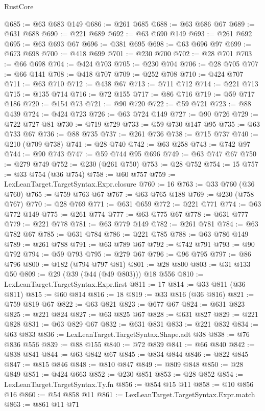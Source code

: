 \begin{lexlean}{RustCore}
\begin{coremodule}
@685 := @63 @683 @149
@686 := @261 @685
@688 := @63 @686 @67
@689 := @631 @688
@690 := @221 @689
@692 := @63 @690 @149
@693 := @261 @692
@695 := @63 @693 @67
@696 := @381 @695
@698 := @63 @696 @97
@699 := @673 @698
@700 := @418 @699
@701 := @230 @700
@702 := @28 @701
@703 := @66 @698
@704 := @424 @703
@705 := @230 @704
@706 := @28 @705
@707 := @66 @141
@708 := @418 @707
@709 := @252 @708
@710 := @424 @707
@711 := @63 @710
@712 := @438 @67
@713 := @711 @712
@714 := @221 @713
@715 := @135 @714
@716 := @72 @155
@717 := @86 @716
@719 := @59 @717 @186
@720 := @154 @73
@721 := @90 @720
@722 := @59 @721
@723 := @88 @439
@724 := @424 @723
@726 := @63 @724 @149
@727 := @90 @726
@729 := @722 @727 @81
@730 := @719 @729
@733 := @59 @730 @147 @95
@735 := @63 @733 @67
@736 := @88 @735
@737 := @261 @736
@738 := @715 @737
@740 := @210 (@709 @738)
@741 := @28 @740
@742 := @63 @258
@743 := @742 @97
@744 := @90 @743
@747 := @59 @744 @95 @696
@749 := @63 @747 @67
@750 := @279 @749
@752 := @230 (@261 @750)
@753 := @28 @752
@754 := 15
@757 := @33 @754 (@36 @754)
@758 := @60 @757
@759 := LexLeanTarget.TargetSyntax.Expr.closure
@760 := 16
@763 := @33 @760 (@36 @760)
@765 := @759 @763 @67
@767 := @63 @765 @188
@769 := @230 (@758 @767)
@770 := @28 @769
@771 := @631 @659
@772 := @221 @771
@774 := @63 @772 @149
@775 := @261 @774
@777 := @63 @775 @67
@778 := @631 @777
@779 := @221 @778
@781 := @63 @779 @149
@782 := @261 @781
@784 := @63 @782 @67
@785 := @631 @784
@786 := @221 @785
@788 := @63 @786 @149
@789 := @261 @788
@791 := @63 @789 @67
@792 := @742 @791
@793 := @90 @792
@794 := @59 @793
@795 := @279 @67
@796 := @96 @795
@797 := @86 @796
@800 := @182 (@794 @797 @81)
@801 := @28 @800
@803 := @31 @133 @50
@809 := @29 (@39 (@44 (@49 @803))) @18 @556
@810 := LexLeanTarget.TargetSyntax.Expr.first
@811 := 17
@814 := @33 @811 (@36 @811)
@815 := @60 @814
@816 := 18
@819 := @33 @816 (@36 @816)
@821 := @759 @819 @67
@822 := @63 @821
@823 := @677 @67
@824 := @631 @823
@825 := @221 @824
@827 := @63 @825 @67
@828 := @631 @827
@829 := @221 @828
@831 := @63 @829 @67
@832 := @631 @831
@833 := @221 @832
@834 := @63 @833
@836 := LexLeanTarget.TargetSyntax.Shape.adt @38
@838 := @76 @836 @556
@839 := @88 @155
@840 := @72 @839
@841 := @66 @840
@842 := @838 @841
@844 := @63 @842 @67
@845 := @834 @844
@846 := @822 @845
@847 := @815 @846
@848 := @810 @847
@849 := @809 @848
@850 := @28 @849
@851 := @424 @663
@852 := @230 @851
@853 := @28 @852
@854 := LexLeanTarget.TargetSyntax.Ty.fn
@856 := @854 @15 @11
@858 := @10 @856 @16
@860 := @54 @858 @11
@861 := LexLeanTarget.TargetSyntax.Expr.match
@863 := @861 @11 @71

\end{coremodule}
\end{lexlean}
